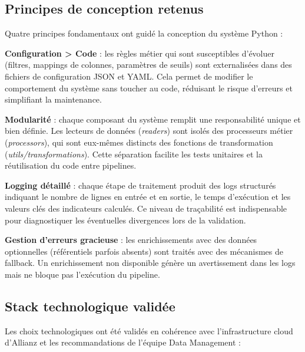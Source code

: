\subsection{Principes de conception retenus}

Quatre principes fondamentaux ont guidé la conception du système Python :

\textbf{Configuration > Code} : les règles métier qui sont susceptibles d'évoluer (filtres, mappings de colonnes, paramètres de seuils) sont externalisées dans des fichiers de configuration JSON et YAML. Cela permet de modifier le comportement du système sans toucher au code, réduisant le risque d'erreurs et simplifiant la maintenance.

\textbf{Modularité} : chaque composant du système remplit une responsabilité unique et bien définie. Les lecteurs de données (\textit{readers}) sont isolés des processeurs métier (\textit{processors}), qui sont eux-mêmes distincts des fonctions de transformation (\textit{utils/transformations}). Cette séparation facilite les tests unitaires et la réutilisation du code entre pipelines.

\textbf{Logging détaillé} : chaque étape de traitement produit des logs structurés indiquant le nombre de lignes en entrée et en sortie, le temps d'exécution et les valeurs clés des indicateurs calculés. Ce niveau de traçabilité est indispensable pour diagnostiquer les éventuelles divergences lors de la validation.

\textbf{Gestion d'erreurs gracieuse} : les enrichissements avec des données optionnelles (référentiels parfois absents) sont traités avec des mécanismes de fallback. Un enrichissement non disponible génère un avertissement dans les logs mais ne bloque pas l'exécution du pipeline.

\subsection{Stack technologique validée}

Les choix technologiques ont été validés en cohérence avec l'infrastructure cloud d'Allianz et les recommandations de l'équipe Data Management :


